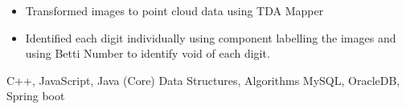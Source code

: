 \begin{itemize}
\item Transformed images to point cloud data using TDA Mapper
\item Identified each digit individually using component labelling the
images and using Betti Number to identify void of each digit.
\end{itemize}



C++, JavaScript, Java (Core) \newline
Data Structures, Algorithms \newline
MySQL, OracleDB, Spring boot \newline




